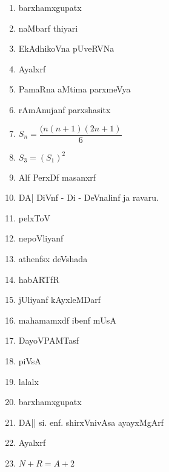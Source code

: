\begin{enumerate}
\item barxhamxgupatx

\item naMbarf thiyari

\item EkAdhikoVna pUveRVNa

\item Ayalxrf

\item PamaRna aMtima parxmeVya

\item rAmAnujanf parxshasitx

\item $S_n = \dfrac{(n(n+1)(2n+1)}{6}$

\item $S_3=(S_1)^2$

\item Alf PerxDf masanxrf

\item DA| DiVnf - Di - DeVnalinf ja ravaru.

\item pelxToV

\item nepoVliyanf

\item athenfsx deVshada

\item habARTfR

\item jUliyanf kAyxleMDarf

\item mahamamxdf ibenf mUsA

\item DayoVPAMTasf

\item piVsA

\item lalalx

\item barxhamxgupatx

\item DA|| si. enf. shirxVnivAsa ayayxMgArf

\item Ayalxrf

\item $N+R=A+2$

\end{enumerate}

